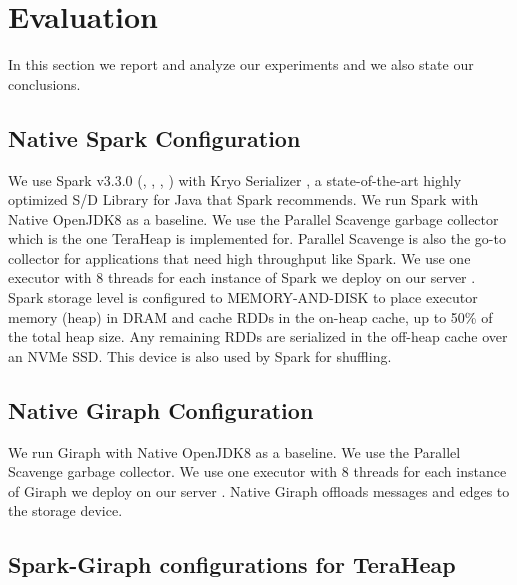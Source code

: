 \section{Evaluation}
\label{sec:eval}

In this section we report and analyze our experiments and we also state our conclusions.

\subsection{Native Spark Configuration}
We use Spark v3.3.0 (\cite{Building}, \cite{Tuning}, \cite{Conf}, \cite{Monitoring}) with Kryo Serializer \cite{Kryo}, a state-of-the-art highly optimized S/D Library for Java that Spark recommends. We run Spark
with Native OpenJDK8 \cite{JDK8} as a baseline. We use the Parallel Scavenge
garbage collector which is the one TeraHeap is implemented for.
Parallel Scavenge is also the go-to collector for applications that
need high throughput like Spark. We use one executor with 8
threads for each instance of Spark we deploy on our server \cite{TeraHeap}. Spark storage level
is configured to MEMORY-AND-DISK to place executor memory (heap) in DRAM and cache RDDs \cite{RDD}
in the on-heap cache, up to 50\% of the total heap size. Any remaining
RDDs are serialized in the off-heap cache over an NVMe SSD. This
device is also used by Spark for shuffling. 

\subsection{Native Giraph Configuration}
We run Giraph with Native OpenJDK8 \cite{JDK8} as a baseline. We use the Parallel Scavenge
garbage collector. We use one executor with 8 threads for each instance of Giraph we deploy on our server \cite{TeraHeap}. Native Giraph offloads messages and edges to the storage device.

\subsection{Spark-Giraph configurations for TeraHeap}


